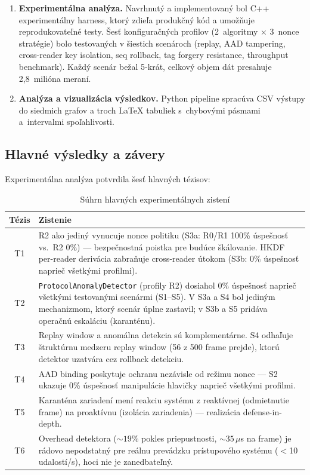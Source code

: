 \begin{enumerate}[leftmargin=*,itemsep=3pt]
  \item \textbf{Experimentálna analýza.} Navrhnutý a implementovaný bol C++ experimentálny harness, ktorý zdieľa produkčný kód a umožňuje reprodukovateľné testy. Šesť konfiguračných profilov (2~algoritmy $\times$ 3~nonce stratégie) bolo testovaných v šiestich scenároch (replay, AAD tampering, cross-reader key isolation, seq rollback, tag forgery resistance, throughput benchmark). Každý scenár bežal 5-krát, celkový objem dát presahuje 2{,}8~milióna meraní.

  \item \textbf{Analýza a vizualizácia výsledkov.} Python pipeline spracúva CSV výstupy do siedmich grafov a troch LaTeX tabuliek s~chybovými pásmami a~intervalmi spoľahlivosti.
\end{enumerate}

\subsection{Hlavné výsledky a závery}

Experimentálna analýza potvrdila šesť hlavných tézisov:

\begin{table}[htbp]
\renewcommand{\arraystretch}{1.3}
\centering
\caption{Súhrn hlavných experimentálnych zistení}
\label{tab:findings}
\small
\begin{tabular}{c p{10.5cm}}
\toprule
\textbf{Tézis} & \textbf{Zistenie} \\
\midrule
T1 & R2 ako jediný vynucuje nonce politiku (S3a: R0/R1 100\% úspešnosť vs.\ R2 0\%) --- bezpečnostná poistka pre budúce škálovanie. HKDF per-reader derivácia zabraňuje cross-reader útokom (S3b: 0\% úspešnosť naprieč všetkými profilmi). \\
T2 & \texttt{ProtocolAnomalyDetector} (profily R2) dosiahol 0\% úspešnosť naprieč všetkými testovanými scenármi (S1--S5). V S3a a S4 bol jediným mechanizmom, ktorý scenár úplne zastavil; v S3b a S5 pridáva operačnú eskaláciu (karanténu). \\
T3 & Replay window a anomálna detekcia sú komplementárne. S4 odhaľuje štruktúrnu medzeru replay window (56 z 500 frame prejde), ktorú detektor uzatvára cez rollback detekciu. \\
T4 & AAD binding poskytuje ochranu nezávisle od režimu nonce --- S2 ukazuje 0\% úspešnosť manipulácie hlavičky naprieč všetkými profilmi. \\
T5 & Karanténa zariadení mení reakciu systému z reaktívnej (odmietnutie frame) na proaktívnu (izolácia zariadenia) --- realizácia defense-in-depth\cite{DefenseInDepth}. \\
T6 & Overhead detektora (${\sim}19\%$ pokles priepustnosti, ${\sim}35\,\mu$s na frame) je rádovo nepodstatný pre reálnu prevádzku prístupového systému ($<$10 udalostí/s), hoci nie je zanedbateľný. \\
\bottomrule
\end{tabular}
\end{table}

